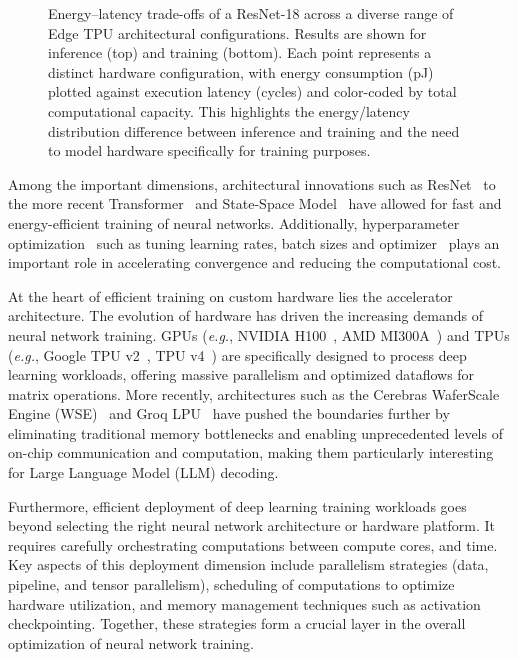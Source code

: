 \documentclass[lettersize,journal]{IEEEtran}
\begin{document}
\begin{figure}[t!]
\begin{center}

\end{center}
\vspace{-0.5cm}
\caption{Energy–latency trade-offs of a ResNet-18 across a diverse range of Edge TPU architectural configurations. Results are shown for inference (top) and training (bottom). Each point represents a distinct hardware configuration, with energy consumption (pJ) plotted against execution latency (cycles) and color-coded by total computational capacity. This highlights the energy/latency distribution difference between inference and training and the need to model hardware specifically for training purposes.}
\label{fig:main}
\end{figure}
Among the important dimensions, architectural innovations such as ResNet~\cite{he2016deep} to the more recent Transformer~\cite{vaswani2017attention} and State-Space Model~\cite{guefficiently} have allowed for fast and energy-efficient training of neural networks. Additionally, hyperparameter optimization~\cite{franceschi2024hyperparameter,li2018hyperband} such as tuning learning rates, batch sizes and optimizer~\cite{liu2025muon, kingma2014adam} plays an important role in accelerating convergence and reducing the computational cost.
\IEEEpubidadjcol

At the heart of efficient training on custom hardware lies the accelerator architecture. The evolution of hardware has driven the increasing demands of neural network training. GPUs (\emph{e.g.}, NVIDIA H100~\cite{nvidia_h100_whitepaper}, AMD MI300A~\cite{amd2024mi300A}) and TPUs (\emph{e.g.}, Google TPU v2~\cite{google2020tpuv2}, TPU v4~\cite{google2023TPUv4}) are specifically designed to process deep learning workloads, offering massive parallelism and optimized dataflows for matrix operations. More recently, architectures such as the Cerebras WaferScale Engine (WSE)~\cite{Cerebras2023WSE} and Groq LPU~\cite{groq2022lpu} have pushed the boundaries further by eliminating traditional memory bottlenecks and enabling unprecedented levels of on-chip communication and computation, making them particularly interesting for Large Language Model (LLM) decoding.


Furthermore, efficient deployment of deep learning training workloads goes beyond selecting the right neural network architecture or hardware platform. It requires carefully orchestrating computations between compute cores, and time. Key aspects of this deployment dimension include parallelism strategies (data, pipeline, and tensor parallelism), scheduling of computations to optimize hardware utilization, and memory management techniques such as activation checkpointing. Together, these strategies form a crucial layer in the overall optimization of neural network training.
\end{document}
